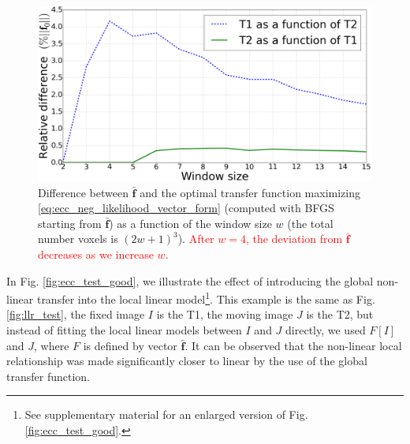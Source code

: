 \begin{figure}[t]
\centering
    \includegraphics[width=1.0\linewidth]{images/LLR_transfer_rmse_centered.png}
    \caption{{\small Difference between $\mathbf{\bar{f}}$ and the optimal transfer function maximizing \eqref{eq:ecc_neg_likelihood_vector_form} (computed with BFGS starting from $\mathbf{\bar{f}}$) as a function of the window size $w$ (the total number voxels is $(2w+1)^{3}$). \textcolor{red}{After $w=4$, the deviation from $\mathbf{\bar{f}}$ decreases as we increase $w$.}}}
\label{fig:LLR_transfer_rmse}\figcloser
\end{figure}
In Fig. \ref{fig:ecc_test_good}, we illustrate the effect of introducing the global non-linear transfer into the local linear model\footnote{See supplementary material for an enlarged version of Fig. \ref{fig:ecc_test_good}.}. This example is the same as Fig. \ref{fig:llr_test}, the fixed image $I$ is the T1, the moving image $J$ is the T2, but instead of fitting the local linear models between $I$ and $J$ directly, we used $F[I]$ and $J$, where $F$ is defined by vector $\mathbf{\bar{f}}$. It can be observed that the non-linear local relationship was made significantly closer to linear by the use of the global transfer function.
